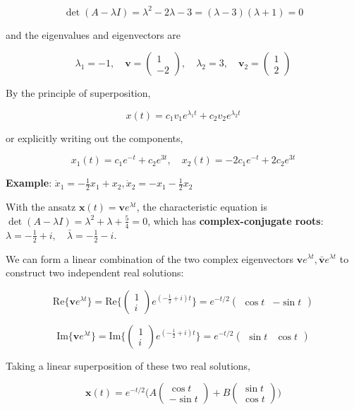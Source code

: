 \begin{paracol}{2}
$$\det(A - \lambda I) = \lambda^2 - 2 \lambda - 3 = (\lambda -3) (\lambda + 1) = 0$$

and the eigenvalues and eigenvectors are

$$\lambda_1 = -1, \quad \mathbf{v} = \begin{pmatrix}
    1 \\ -2
\end{pmatrix}, \quad \lambda_2 = 3, \quad \mathbf{v}_2 = \begin{pmatrix}
    1 \\ 2
\end{pmatrix}$$

By the principle of superposition,

$$x(t) = c_1 v_1 e^{\lambda_1 t} + c_2 v_2 e^{\lambda_2 t}$$

or explicitly writing out the components,

$$x_1(t) = c_1 e^{-t} + c_2 e^{3t}, \quad x_2(t) = -2 c_1 e^{-t} + 2 c_2 e^{3t}$$

\switchcolumn

\textbf{Example}: $\dot{x}_1 = - \frac{1}{2} x_1 + x_2, \dot{x}_2 = - x_1 - \frac{1}{2} x_2$

With the ansatz $\mathbf{x}(t) = \mathbf{v} e^{\lambda t}$, the characteristic equation is $\det(A - \lambda I) = \lambda^2 + \lambda + \frac{5}{4} = 0$, which has \textbf{complex-conjugate roots}: $\lambda = - \frac{1}{2} + i, \quad \bar{\lambda} = - \frac{1}{2} - i$.

We can form a linear combination of the two complex eigenvectors $\mathbf{v} e^{\lambda t}, \bar{\mathbf{v}} e^{\lambda t}$ to construct two independent real solutions:

$$\text{Re}\{ \mathbf{v} e^{\lambda t} \} = \text{Re}\{ \begin{pmatrix}
    1 \\ i
\end{pmatrix} e^{(-\frac{1}{2} + i)t} \} = e^{-t / 2} \begin{pmatrix}
    \cos{t} & - \sin{t}
\end{pmatrix}$$

$$\text{Im}\{ \mathbf{v} e^{\lambda t} \} = \text{Im}\{ \begin{pmatrix}
    1 \\ i
\end{pmatrix} e^{(-\frac{1}{2} + i)t} \} = e^{-t / 2} \begin{pmatrix}
    \sin{t} & \cos{t}
\end{pmatrix}$$

Taking a linear superposition of these two real solutions,

$$\mathbf{x}(t) = e^{-t / 2} \Bigg( A \begin{pmatrix}
    \cos{t} \\ - \sin{t}
\end{pmatrix} + B \begin{pmatrix}
    \sin{t} \\ \cos{t}
\end{pmatrix} \Bigg)$$

\end{paracol}

